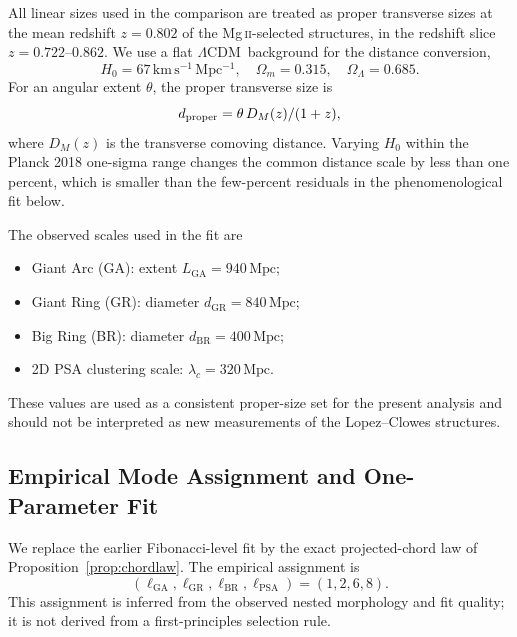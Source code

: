 \documentclass[
  aps,
  prd,
  reprint,
  superscriptaddress,
  nofootinbib,
  longbibliography,
  floatfix,
  amsmath,
  amssymb
]{revtex4-2}
\theoremstyle{plain}
\theoremstyle{definition}
\theoremstyle{remark}
\newcommand{\LCDM}{\ensuremath{\Lambda}CDM}
\begin{document}
All linear sizes used in the comparison are treated as proper transverse
sizes at the mean redshift $z=0.802$ of the Mg\,\textsc{ii}-selected
structures, in the redshift slice $z=0.722$--$0.862$. We use a flat
\LCDM\ background for the distance conversion,
\begin{equation}
  H_0=67\,\mathrm{km\,s^{-1}\,Mpc^{-1}},\quad
  \Omega_m=0.315,\quad \Omega_\Lambda=0.685 .
\end{equation}
For an angular extent $\theta$, the proper transverse size is
\begin{equation}
  d_{\rm proper}=\theta\,D_M(z)/(1+z),
\end{equation}
where $D_M(z)$ is the transverse comoving distance. Varying $H_0$ within
the Planck 2018 one-sigma range changes the common distance scale by less
than one percent, which is smaller than the few-percent residuals in the
phenomenological fit below.

The observed scales used in the fit are
\begin{itemize}[noitemsep]
\item Giant Arc (GA): extent $L_{\mathrm{GA}}=940\,\mathrm{Mpc}$;
\item Giant Ring (GR): diameter $d_{\mathrm{GR}}=840\,\mathrm{Mpc}$;
\item Big Ring (BR): diameter $d_{\mathrm{BR}}=400\,\mathrm{Mpc}$;
\item 2D PSA clustering scale: $\lambda_c=320\,\mathrm{Mpc}$.
\end{itemize}
These values are used as a consistent proper-size set for the present
analysis and should not be interpreted as new measurements of the
Lopez--Clowes structures.

\subsection{Empirical Mode Assignment and One-Parameter Fit}

We replace the earlier Fibonacci-level fit by the exact projected-chord
law of Proposition~\ref{prop:chordlaw}. The empirical assignment is
\begin{equation}
  (\ell_{\mathrm{GA}},\ell_{\mathrm{GR}},\ell_{\mathrm{BR}},\ell_{\mathrm{PSA}})
  =(1,2,6,8).
  \label{eq:ellassign}
\end{equation}
This assignment is inferred from the observed nested morphology and fit
quality; it is not derived from a first-principles selection rule.
\end{document}
